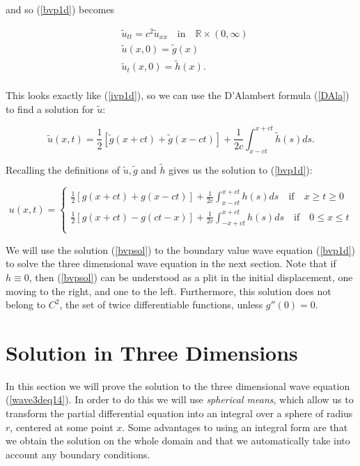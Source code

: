 \documentclass[12pt]{article}
\numberwithin{equation}{section}
\begin{document}
and so (\ref{bvp1d}) becomes 

\begin{equation*}
    \begin{aligned}
        &\tilde{u}_{tt}=c^2\tilde{u}_{xx} \quad \textrm{in} \quad \mathbb{R}\times(0,\infty)\\
        &\tilde{u}(x,0)=\tilde{g}(x)\\
        &\tilde{u}_t(x,0)=\tilde{h}(x).\\
    \end{aligned}
\end{equation*}

This looks exactly like (\ref{ivp1d}), so we can use the D'Alambert formula (\ref{DAla}) to find a solution for $\tilde{u}$:

\begin{equation*}
    \tilde{u}(x,t)=\frac{1}{2}\left[\tilde{g}(x+ct)+\tilde{g}(x-ct)\right]+\frac{1}{2c}\int^{x+ct}_{x-ct}\tilde{h}(s)ds.
\end{equation*}

Recalling the definitions of $\tilde{u}, \tilde{g}$ and $\tilde{h}$ gives us the solution to (\ref{bvp1d}):

\begin{equation} \label{bvpsol}
    u(x,t)=
    \begin{cases}
        \frac{1}{2}\left[g(x+ct)+g(x-ct)\right]+\frac{1}{2c}\int^{x+ct}_{x-ct}h(s)ds \quad \textrm{if} \quad x \ge t \ge 0\\
        \frac{1}{2}\left[g(x+ct)-g(ct-x)\right]+\frac{1}{2c}\int^{x+ct}_{-x+ct}h(s)ds \quad \textrm{if} \quad 0 \le x \le t\\
    \end{cases}
\end{equation}

We will use the solution (\ref{bvpsol}) to the boundary value wave equation (\ref{bvp1d}) to solve the three dimensional wave equation in 
the next section. Note that if $h \equiv 0$, then (\ref{bvpsol}) can be understood as a plit in the initial displacement, one moving
to the right, and one to the left. \cite{Ev} Furthermore, this solution does not belong to $C^2$, the set of twice differentiable functions, 
unless $g''(0)=0$.

\section{Solution in Three Dimensions}
In this section we will prove the solution to the three dimensional wave equation (\ref{wave3deq14}). In order to do this we will use \emph{spherical
means}, which allow us to transform the partial differential equation into an integral over a sphere of radius $r$, centered at some point $x$. 
Some advantages to using an integral form are that we obtain the solution on the whole domain and that we automatically take into account any
boundary conditions. \cite{Sab} 
\\
\end{document}
